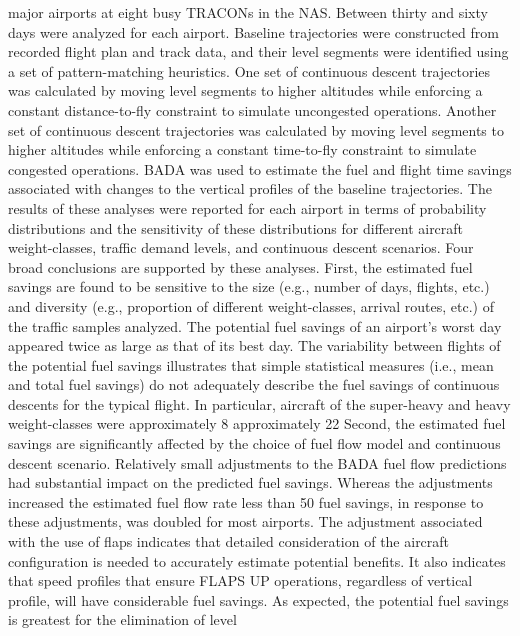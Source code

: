 \documentclass{aer1315-pretty}
\begin{document}
\begin{itemize}
major airports at eight busy TRACONs in the NAS. Between thirty and sixty days were analyzed for each airport.
Baseline trajectories were constructed from recorded flight plan and track data, and their level segments were
identified using a set of pattern-matching heuristics. One set of continuous descent trajectories was calculated by
moving level segments to higher altitudes while enforcing a constant distance-to-fly constraint to simulate
uncongested operations. Another set of continuous descent trajectories was calculated by moving level segments to
higher altitudes while enforcing a constant time-to-fly constraint to simulate congested operations. BADA was used
to estimate the fuel and flight time savings associated with changes to the vertical profiles of the baseline
trajectories. The results of these analyses were reported for each airport in terms of probability distributions and the
sensitivity of these distributions for different aircraft weight-classes, traffic demand levels, and continuous descent
scenarios. Four broad conclusions are supported by these analyses.
    First, the estimated fuel savings are found to be sensitive to the size (e.g., number of days, flights, etc.) and
diversity (e.g., proportion of different weight-classes, arrival routes, etc.) of the traffic samples analyzed. The
potential fuel savings of an airport’s worst day appeared twice as large as that of its best day. The variability
between flights of the potential fuel savings illustrates that simple statistical measures (i.e., mean and total fuel
savings) do not adequately describe the fuel savings of continuous descents for the typical flight. In particular,
aircraft of the super-heavy and heavy weight-classes were approximately 8%
approximately 22%
    Second, the estimated fuel savings are significantly affected by the choice of fuel flow model and continuous
descent scenario. Relatively small adjustments to the BADA fuel flow predictions had substantial impact on the
predicted fuel savings. Whereas the adjustments increased the estimated fuel flow rate less than 50%
fuel savings, in response to these adjustments, was doubled for most airports. The adjustment associated with the use
of flaps indicates that detailed consideration of the aircraft configuration is needed to accurately estimate potential
benefits. It also indicates that speed profiles that ensure FLAPS UP operations, regardless of vertical profile, will
have considerable fuel savings. As expected, the potential fuel savings is greatest for the elimination of level

\end{itemize}
\end{document}
